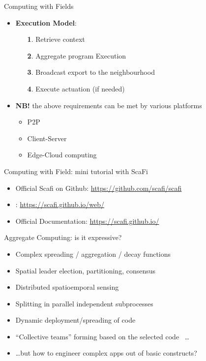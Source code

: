 \documentclass[8pt, aspectratio=169, handout]{beamer}
\begin{document}
\begin{frame}{Computing with Fields}
\begin{card}
\begin{itemize}
\begin{itemize}
    \end{itemize}
    \item \textbf{Execution Model}:
    \begin{enumerate}
      \item[\textbf{1}.] Retrieve context
      \item[\textbf{2}.] Aggregate program Execution
      \item[\textbf{3}.] Broadcast export to the neighbourhood
      \item[\textbf{4}.] Execute actuation (if needed)
    \end{enumerate}
    \item \textbf{NB!} the above requirements can be met by various platforms
    \begin{itemize}
      \item P2P
      \item Client-Server
      \item Edge-Cloud computing
    \end{itemize}
  \end{itemize}
\end{card}
\end{frame}
\begin{frame}{Computing with Field: mini tutorial with ScaFi}
  \begin{card}[References]
    \begin{itemize}
    \item Official Scafi on Github: \url{https://github.com/scafi/scafi}
    \item {}: \url{https://scafi.github.io/web/}
    \item Official Documentation: \url{https://scafi.github.io/}
    \end{itemize}
  \end{card}
  \centering
\end{frame}
\begin{frame}{Aggregate Computing: is it expressive?}
  \begin{card}
    \begin{itemize}
      \item Complex spreading / aggregation / decay functions~\cite{beal2015aggregate-programming}
      \item Spatial leader election, partitioning, consensus~\cite{damiani2015code}
      \item Distributed spatioemporal sensing~\cite{viroli2016execution}
      \item Splitting in parallel independent subprocesses~\cite{viroli2016execution}
      \item Dynamic deployment/spreading of code~\cite{damiani2015code}
      \item ``Collective teams'' forming based on the selected code~\cite{viroli2015multi} \dots
      \item \dots but how to engineer complex apps out of basic constructs?
    \end{itemize}
  \end{card}
\end{frame}
\end{document}
